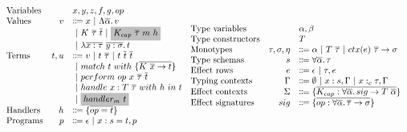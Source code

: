 \documentclass[acmsmall]{acmart}
\newcommand{\graybox}[1]{\colorbox{lightgray}{$\displaystyle #1$}}
\newcommand{\vor}{~|~}
\newcommand{\ap}{~}
\newcommand{\ctx}[1]{ctx(#1)~}
\begin{document}
\begin{figure}
    \centering
    \begin{gather*}
        \begin{array}{lrll}
            \text{Variables} & & x, y, z, f, g, op \\
            \text{Values} &v &\Coloneqq x \vor \Lambda \overline{\alpha} \ldotp v \\
            &&\vor K\ap \overline{\tau} \ap \overline{t} \vor \graybox{K_{cap}\ap\overline{\tau}\ap m\ap h} \\
            &&\vor \lambda \overline{x : \tau}~\overline{y : \sigma}\ldotp t
            \\
            \text{Terms} &t, u &\Coloneqq v \vor t\ap\overline{\tau} \vor t \ap \overline{t} \ap \overline{t} \\
            &&\vor match ~ t ~ with ~\{\overline{K \ap \overline{x} \to t}\} \\
            &&\vor perform ~ op \ap x \ap \overline{\tau} \ap \overline{t} \\
            &&\vor handle ~ x : T \ap \overline{\tau} ~with ~h~in ~t \\
            &&\vor \graybox{handler_m ~ t}
            \\
            \text{Handlers} &h &\Coloneqq \{ \overline{op = t} \}
            \\
            \text{Programs} &p &\Coloneqq \epsilon \vor x : s = t, p
        \end{array}
        \begin{array}{lrl}
            \text{Type variables} && \alpha, \beta \\
            \text{Type constructors} && T \\
            \text{Monotypes} & \tau, \sigma, \eta &\Coloneqq \alpha \vor T \ap \overline{\tau} \vor \ctx{e} \overline{\tau} \to \sigma \\
            \text{Type schemas} & s &\Coloneqq \forall\overline{\alpha}\ldotp \tau \\
            \text{Effect rows} & e &\Coloneqq \epsilon\vor \tau, e \\
            \text{Typing contexts} & \Gamma &\Coloneqq \emptyset \vor x : s, \Gamma \vor x :_c \tau, \Gamma \\
            \text{Effect contexts} & \Sigma &\Coloneqq \{\overline{K_{cap} : \forall\overline{\alpha}\ldotp sig\to T\ap\overline{\alpha}}\} \\
            \text{Effect signatures} & sig &\Coloneqq \{\overline{op : \forall\overline{\alpha}\ldotp\overline{\tau}\to\sigma}\} \\

\end{array}
\end{gather*}
\end{figure}
\end{document}

